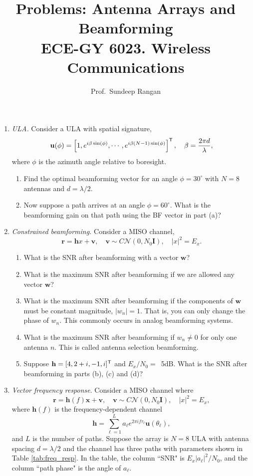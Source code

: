 \documentclass[11pt]{article}
\newcommand{\hbf}{\mathbf{h}}
\newcommand{\rbf}{\mathbf{r}}
\newcommand{\ubf}{\mathbf{u}}
\newcommand{\vbf}{\mathbf{v}}
\newcommand{\wbf}{\mathbf{w}}
\newcommand{\xbf}{\mathbf{x}}
\newcommand{\Ibf}{\mathbf{I}}
\newcommand{\tran}{^{\text{\sf T}}}
\begin{document}
\title{Problems:  Antenna Arrays and Beamforming\\
ECE-GY 6023. Wireless Communications}
\author{Prof.\ Sundeep Rangan}
\date{}

\maketitle


\begin{enumerate}

\item \emph{ULA.}  Consider a ULA with spatial signature,
\[
    \ubf(\phi) = \left[ 1, e^{i \beta \sin(\phi)}, \cdots,
    e^{i \beta(N-1) \sin(\phi)} \right]\tran, \quad
    \beta = \frac{2\pi d}{\lambda},
\]
where $\phi$ is the azimuth angle relative to boresight.
\begin{enumerate}[label=(\alph*)]
\item Find the optimal beamforming vector for an angle $\phi= 30^\circ$
with $N=8$ antennas and $d=\lambda/2$.
\item Now suppose a path arrives at an angle $\phi = 60^\circ$.
What is the beamforming gain on that path using the BF vector in part (a)?
\end{enumerate}

\item \emph{Constrained beamforming.} Consider a MISO channel,
\[
    \rbf = \hbf x + \vbf, \quad \vbf \sim C{\mathcal N}(0,N_0 \Ibf), \quad |x|^2 = E_x.
\]
\begin{enumerate}[label=(\alph*)]
\item What is the SNR after beamforming with a vector $\wbf$?
\item What is the maximum SNR after beamforming if we are allowed any vector $\wbf$?
\item What is the maximum SNR after beamforming if the components of $\wbf$ 
must be constant magnitude, $|w_n| = 1$.  That is, you can only change the phase of $w_n$.
This commonly occurs in analog beamforming systems.
\item What is the maximum SNR after beamforming if 
$w_n \neq 0$ for only one antenna $n$.  This is called antenna selection beamforming.
\item Suppose $\hbf = [4,2+i,-1,i]\tran$ and $E_x/N_0=$\, \si{5}{dB}.  What is the SNR
after beamforming in parts (b), (c) and (d)?
\end{enumerate}


\item \label{prob:freq_resp} 
\emph{Vector frequency response}.  Consider a MISO channel where
\[
    \rbf = \hbf(f)\xbf + \vbf, \quad \vbf \sim C{\mathcal N}(0,N_0 \Ibf), \quad |x|^2 = E_x,
\]
where $\hbf(f)$ is the frequency-dependent channel
\[
    \hbf = \sum_{\ell=1}^L a_\ell e^{2\pi if \tau_\ell} \ubf(\theta_\ell),
\]
and $L$ is the number of paths. Suppose the
array is $N=8$ ULA with antenna spacing $d=\lambda/2$ and the channel
has three paths with parameters shown in Table \ref{tab:freq_resp}.
In the table, the column ``SNR" is $E_x|a_\ell|^2/N_0$, and the column ``path phase" is the angle of $a_\ell$.


\end{enumerate}
\end{document}
